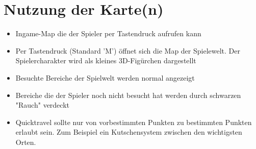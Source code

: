 \chapter{Nutzung der Karte(n)}
\begin{itemize}
	\item Ingame-Map die der Spieler per Tastendruck aufrufen kann
	\item Per Tastendruck (Standard 'M') öffnet sich die Map der Spielewelt. Der Spielercharakter wird als kleines 3D-Figürchen dargestellt
	\item Besuchte Bereiche der Spielwelt werden normal angezeigt
	\item Bereiche die der Spieler noch nicht besucht hat werden durch schwarzen "Rauch" verdeckt
	\item Quicktravel sollte nur von vorbestimmten Punkten zu bestimmten Punkten erlaubt sein. Zum Beispiel ein Kutschensystem zwischen den wichtigsten Orten.
\end{itemize}